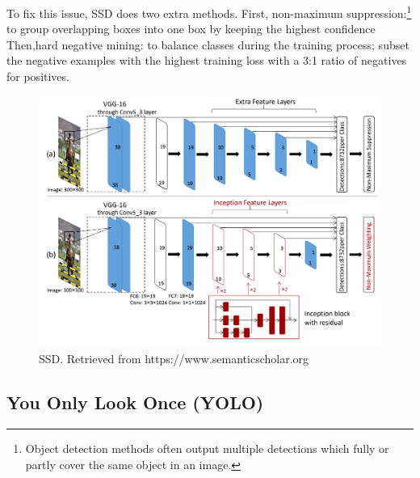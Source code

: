 \documentclass[12pt]{report}
\begin{document}
                    To fix this issue, SSD does two extra methods.
                    First, non-maximum suppression:\footnote{Object detection methods often output multiple detections which fully or partly cover the same object in an image.}
                    to group overlapping boxes into one box by keeping the highest confidence
                    Then,hard negative mining: to balance classes during the training process; subset the negative examples 
                    with the highest training loss with a 3:1 ratio of negatives for positives.\cite{Liu2016}

                    \begin{figure}[h]
                    \centering
                    \includegraphics[width=.8\textwidth]{./images/ssd.png}
                    \caption{SSD. Retrieved from https://www.semanticscholar.org}
                    \label{fig:frcnn}
                    \end{figure} 



                \subsection{You Only Look Once (YOLO)}
                 
\end{document}
